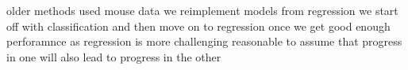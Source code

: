 




older methods used mouse data
we reimplement models from regression
we start off with classification and then move on to regression once we get good enough perforamnce as regression is more challenging
reasonable to assume that progress in one will also lead to progress in the other




